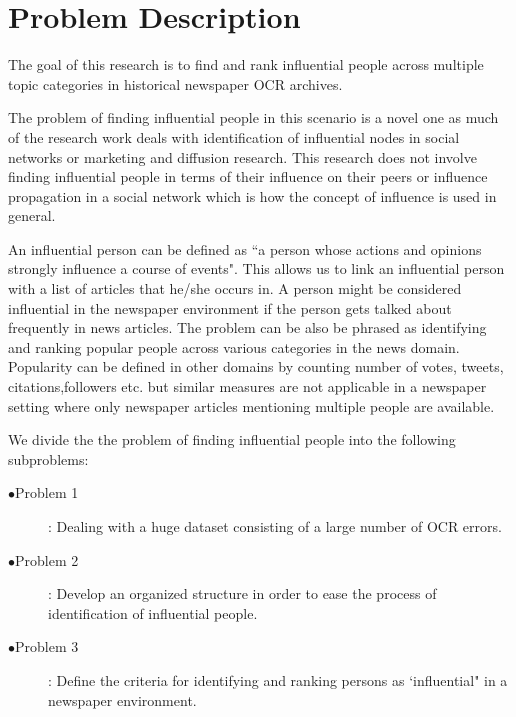 \section{Problem Description}
\label{problem}


The goal of this research is to find and rank influential people across multiple topic categories in historical newspaper OCR archives.


The problem of finding influential people in this scenario is a novel one as much of the research work deals with identification of influential nodes in social networks or marketing and diffusion research. This research does not involve finding influential people in terms of their influence on their peers\cite{watts2007influentials} or influence propagation in a social network \cite{kempe2003maximizing} which is how the concept of influence is used in general.   

 An influential person can be defined as ``a person whose actions and opinions strongly influence a course of events". This allows us to link an influential person with a list of articles that he/she occurs in.
 A person might be considered influential  in the newspaper environment if the person gets talked about frequently in news articles. The problem can be also be phrased as identifying and ranking popular people across various categories in the news domain. 
Popularity can be defined in other domains by counting number of votes, tweets, citations,followers etc. \cite{cheng2014can}but similar measures are not applicable in a newspaper setting where only newspaper articles mentioning multiple people are available.  
 
We divide the the problem of finding influential people into the following subproblems:
\begin{description}
\item [$\bullet $Problem 1] \label{problem:1}: Dealing with a huge dataset consisting of a large number of OCR errors.
\item [$\bullet $Problem 2] \label{2}: Develop an organized structure in order to ease the process of identification of influential people.
\item [$\bullet $Problem 3] \label{3}: Define the criteria for identifying and ranking persons as `influential" in a newspaper environment.
\end{description}
  
